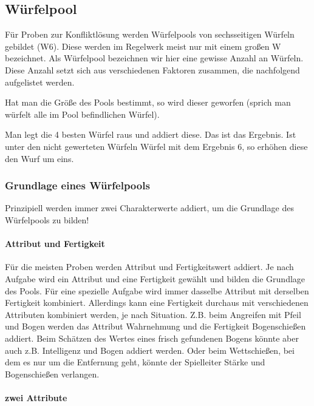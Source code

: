 \documentclass{article}
\begin{document}
\begin{center}
\subsection{Würfelpool}
\end{center}

Für Proben zur Konfliktlösung werden Würfelpools von sechsseitigen Würfeln gebildet (W6). Diese werden im Regelwerk
meist nur mit einem großen W bezeichnet. Als Würfelpool bezeichnen wir hier eine gewisse Anzahl an Würfeln. Diese Anzahl
setzt sich aus verschiedenen Faktoren zusammen, die nachfolgend aufgelistet werden.

Hat man die Größe des Pools bestimmt, so wird dieser geworfen (sprich man würfelt alle im Pool befindlichen Würfel).

Man legt die 4 besten Würfel raus und addiert diese. Das ist das Ergebnis.
Ist unter den nicht gewerteten Würfeln Würfel mit dem Ergebnis 6, so erhöhen diese den Wurf um eins.

\subsubsection{Grundlage eines Würfelpools}

Prinzipiell werden immer zwei Charakterwerte addiert, um die Grundlage des Würfelpools zu bilden!

\paragraph{Attribut und Fertigkeit}

Für die meisten Proben werden Attribut und Fertigkeitswert addiert. Je nach Aufgabe wird ein Attribut und eine
Fertigkeit gewählt und bilden die Grundlage des Pools. Für eine spezielle Aufgabe wird immer dasselbe Attribut mit
derselben Fertigkeit kombiniert. Allerdings kann eine Fertigkeit durchaus mit verschiedenen Attributen kombiniert werden,
je nach Situation. Z.B. beim Angreifen mit Pfeil und Bogen werden das Attribut Wahrnehmung und die Fertigkeit
Bogenschießen addiert. Beim Schätzen des Wertes eines frisch gefundenen Bogens könnte aber auch z.B. Intelligenz und
Bogen addiert werden. Oder beim Wettschießen, bei dem es nur um die Entfernung geht, könnte der Spielleiter Stärke und
Bogenschießen verlangen.

\paragraph{zwei Attribute}
\end{document}
